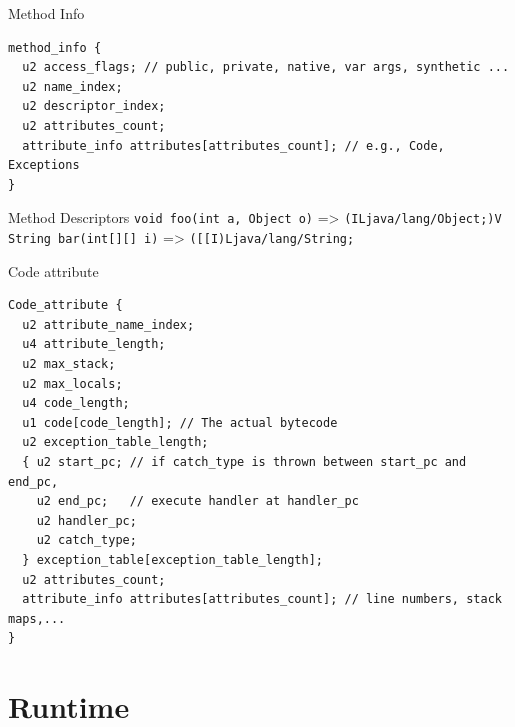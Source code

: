 \documentclass[
14pt,
aspectratio=169,
usenames,
dvipsnames,
x11names]{beamer}
\begin{document}
\begin{frame}[fragile]{Method Info}
\begin{lstlisting}
method_info {
  u2 access_flags; // public, private, native, var args, synthetic ...
  u2 name_index;
  u2 descriptor_index;
  u2 attributes_count;
  attribute_info attributes[attributes_count]; // e.g., Code, Exceptions
}
\end{lstlisting}
\begin{exampleblock}{Method Descriptors}
  \texttt{void foo(int a, Object o)} => \texttt{(ILjava/lang/Object;)V}\\
  \texttt{String bar(int[][] i)} => \texttt{([[I)Ljava/lang/String;}
\end{exampleblock}
\end{frame}

\begin{frame}[fragile]{Code attribute}
\begin{lstlisting}
Code_attribute {
  u2 attribute_name_index;
  u4 attribute_length;
  u2 max_stack;
  u2 max_locals;
  u4 code_length;
  u1 code[code_length]; // The actual bytecode
  u2 exception_table_length;
  { u2 start_pc; // if catch_type is thrown between start_pc and end_pc,
    u2 end_pc;   // execute handler at handler_pc
    u2 handler_pc;
    u2 catch_type;
  } exception_table[exception_table_length];
  u2 attributes_count;
  attribute_info attributes[attributes_count]; // line numbers, stack maps,...
}
\end{lstlisting}
\end{frame}

\section{Runtime}
\end{document}
